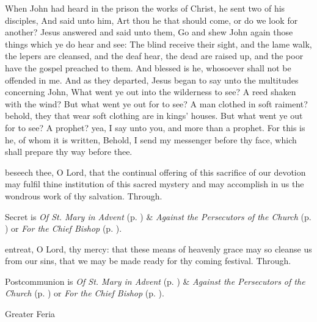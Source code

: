  When John had heard in the prison the works of Christ, he sent two of his disciples, And said unto him, Art thou he that should come, or do we look for another? Jesus answered and said unto them, Go and shew John again those things which ye do hear and see: The blind receive their sight, and the lame walk, the lepers are cleansed, and the deaf hear, the dead are raised up, and the poor have the gospel preached to them. And blessed is he, whosoever shall not be offended in me. And as they departed, Jesus began to say unto the multitudes concerning John, What went ye out into the wilderness to see? A reed shaken with the wind? But what went ye out for to see? A man clothed in soft raiment? behold, they that wear soft clothing are in kings' houses. But what went ye out for to see? A prophet? yea, I say unto you, and more than a prophet. For this is he, of whom it is written, Behold, I send my messenger before thy face, which shall prepare thy way before thee.

\secret
{} beseech thee, O Lord, that the continual offering of this sacrifice of our devotion may fulfil thine institution of this sacred mystery and may accomplish in us the wondrous work of thy salvation. Through.
\begin{rubric}
     Secret is \emph{Of St. Mary in Advent} (p. \pageref{SPMaryInAdvent}) \&  \emph{Against the Persecutors of the Church} (p. \pageref{SPAgainst}) or \emph{For the Chief Bishop} (p. \pageref{SPChiefBishop}).
\end{rubric}


\postcommunion
{} entreat, O Lord, thy mercy: that these means of heavenly grace may so cleanse us from our sins, that we may be made ready for thy coming festival. Through.
\begin{rubric}
     Postcommunion is \emph{Of St. Mary in Advent} (p. \pageref{SPMaryInAdvent}) \&  \emph{Against the Persecutors of the Church} (p. \pageref{SPAgainst}) or \emph{For the Chief Bishop} (p. \pageref{SPChiefBishop}).
\end{rubric}


\begin{inhead}
{Greater Feria}
\end{inhead}

